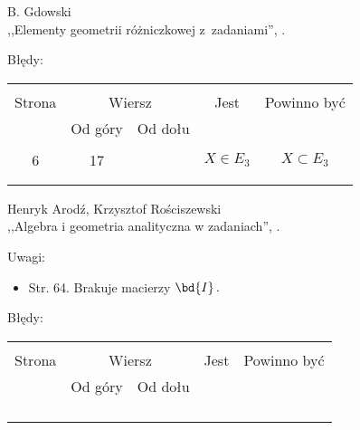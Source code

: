 \begin{center}
  B. Gdowski\\
  ,,Elementy geometrii różniczkowej z~zadaniami'', \cite{Gdo99}.
\end{center}

%

Błędy:\\
\begin{tabular}{|c|c|c|c|c|}
  \hline
  & \multicolumn{2}{c|}{} & & \\
  Strona & \multicolumn{2}{c|}{Wiersz}& Jest & Powinno być \\ \cline{2-3}
  & Od góry & Od dołu &  &  \\ \hline
  & & & & \\
  6 & 17 & & $X \in E_{ 3 }$ & $X \subset E_{ 3 }$ \\
  & & & & \\
  & & & & \\ \hline
\end{tabular}

\begin{center}
  Henryk Arodź, Krzysztof Rościszewski\\
  ,,Algebra i geometria analityczna w zadaniach'', \cite{AR}.
\end{center}


Uwagi:
\begin{itemize}
\item Str. 64. Brakuje macierzy $\bd{I} \, .$
\end{itemize}

Błędy:\\
\begin{tabular}{|c|c|c|c|c|}
  \hline
  & \multicolumn{2}{c|}{} & & \\
  Strona & \multicolumn{2}{c|}{Wiersz}& Jest & Powinno być \\ \cline{2-3}
  & Od góry & Od dołu &  &  \\ \hline
  & & & & \\
  & & & & \\
  & & & & \\
  & & & & \\ \hline
\end{tabular}

